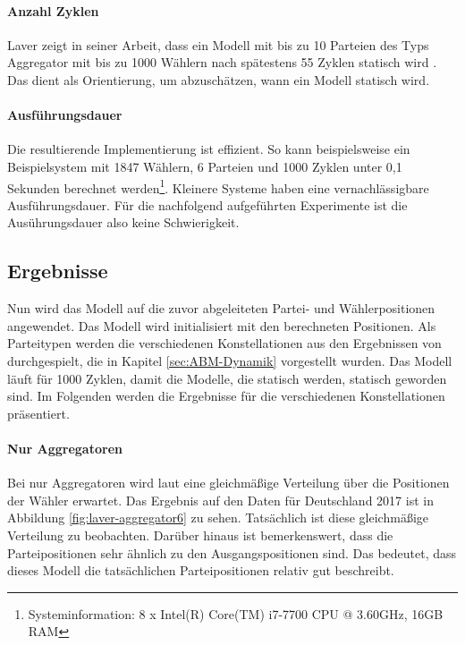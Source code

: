 \paragraph{Anzahl Zyklen}
Laver zeigt in seiner Arbeit, dass ein Modell mit bis zu 10 Parteien des Typs Aggregator mit bis zu 1000 Wählern nach spätestens 55 Zyklen statisch wird \citep[S.\,271-272]{laver2005policy}. Das dient als Orientierung, um abzuschätzen, wann ein Modell statisch wird.

\paragraph{Ausführungsdauer}
Die resultierende Implementierung ist effizient. So kann beispielsweise ein Beispielsystem mit 1847 Wählern, 6 Parteien und 1000 Zyklen unter 0,1 Sekunden berechnet werden\footnote{Systeminformation: 8 x Intel(R) Core(TM) i7-7700 CPU @ 3.60GHz, 16GB RAM}. Kleinere Systeme haben eine vernachlässigbare Ausführungsdauer. Für die nachfolgend aufgeführten Experimente ist die Ausührungsdauer also keine Schwierigkeit.

\subsection{Ergebnisse}

Nun wird das Modell auf die zuvor abgeleiteten Partei- und Wählerpositionen angewendet. Das Modell wird initialisiert mit den berechneten Positionen. Als Parteitypen werden die verschiedenen Konstellationen aus den Ergebnissen von \citet{laver2005policy} durchgespielt, die in Kapitel \ref{sec:ABM-Dynamik} vorgestellt wurden. Das Modell läuft für 1000 Zyklen, damit die Modelle, die statisch werden, statisch geworden sind. Im Folgenden werden die Ergebnisse für die verschiedenen Konstellationen präsentiert.

\paragraph{Nur Aggregatoren}

Bei nur Aggregatoren wird laut \citet{laver2005policy} eine gleichmäßige Verteilung über die Positionen der Wähler erwartet. Das Ergebnis auf den Daten für Deutschland 2017 ist in Abbildung \ref{fig:laver-aggregator6} zu sehen. Tatsächlich ist diese gleichmäßige Verteilung zu beobachten. Darüber hinaus ist bemerkenswert, dass die Parteipositionen sehr ähnlich zu den Ausgangspositionen sind. Das bedeutet, dass dieses Modell die tatsächlichen Parteipositionen relativ gut beschreibt.

